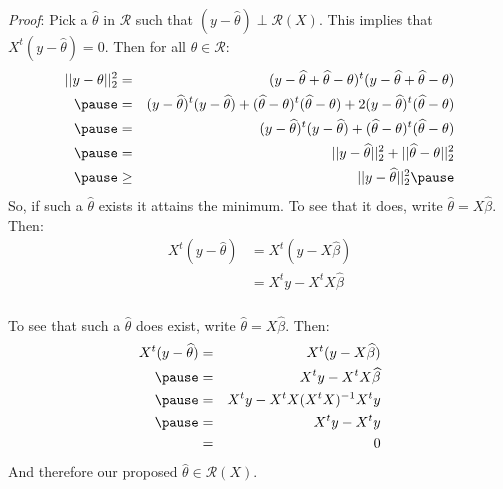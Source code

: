 \begin{frame}[fragile] \frametitle{}

{\it Proof}: Pick a $\widehat{\theta}$ in $\mathcal{R}$ such that
$(y - \widehat{\theta}) \perp \mathcal{R}(X)$. \pause This implies
that $X^{t} (y - \widehat{\theta}) = 0$. Then for all $\theta \in \mathcal{R}$:
\begin{eqnarray*}
|| y - \theta ||_2^2 &=& (y - \widehat{\theta} + \widehat{\theta} - \theta)^t (y - \widehat{\theta} + \widehat{\theta} - \theta) \\ \pause
&=& (y - \widehat{\theta})^t (y - \widehat{\theta}) + (\widehat{\theta} - \theta)^t (\widehat{\theta} - \theta) +
    2 (y - \widehat{\theta})^t (\widehat{\theta} - \theta) \\ \pause
&=& (y - \widehat{\theta})^t (y - \widehat{\theta}) +
    (\widehat{\theta} - \theta)^t (\widehat{\theta} - \theta) \\ \pause
&=& || y - \widehat{\theta} ||^2_2 + || \widehat{\theta} - \theta ||_2^2 \\ \pause
&\geq& || y - \widehat{\theta} ||^2_2 \pause
\end{eqnarray*}
So, if such a $\widehat{\theta}$ exists it attains the minimum. To see that
it does, write $\widehat{\theta} = X \widehat{\beta}$. \pause Then:
\begin{eqnarray*}
X^t ( y - \widehat{\theta} ) &= X^t ( y - X \widehat{\beta} ) \\
&= X^t y - X^t X \widehat{\beta}
\end{eqnarray*}

\end{frame}

\begin{frame}[fragile] \frametitle{}

To see that such a $\widehat{\theta}$ does exist,
write $\widehat{\theta} = X \widehat{\beta}$. \pause Then:
\begin{eqnarray*}
X^t ( y - \widehat{\theta} ) &=& X^t ( y - X \widehat{\beta} ) \\ \pause
&=& X^t y - X^t X \widehat{\beta} \\ \pause
&=& X^t y - X^t X (X^t X)^{-1} X^t y \\ \pause
&=& X^t y - X^t y \\
&=& 0
\end{eqnarray*}
And therefore our proposed $\widehat{\theta} \in \mathcal{R}(X)$.

\end{frame}

